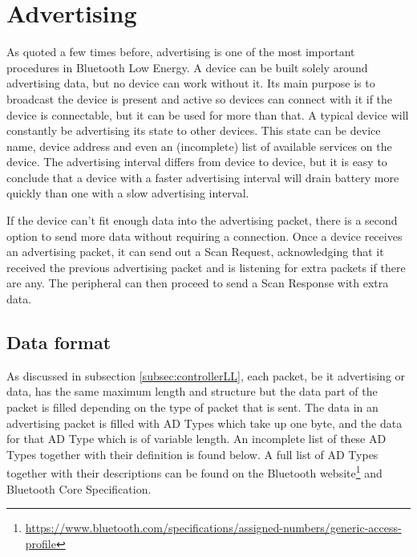 \documentclass[pdftex,a4paper,12pt,twoside]{report}
\begin{document}
\section{Advertising}
\label{sec:advertising}
As quoted a few times before, advertising is one of the most important procedures in Bluetooth Low Energy. A device can be built solely around advertising data, but no device can work without it. Its main purpose is to broadcast the device is present and active so devices can connect with it if the device is connectable, but it can be used for more than that. A typical device will constantly be advertising its state to other devices. This state can be device name, device address and even an (incomplete) list of available services on the device. The advertising interval differs from device to device, but it is easy to conclude that a device with a faster advertising interval will drain battery more quickly than one with a slow advertising interval.

If the device can't fit enough data into the advertising packet, there is a second option to send more data without requiring a connection. Once a device receives an advertising packet, it can send out a Scan Request, acknowledging that it received the previous advertising packet and is listening for extra packets if there are any. The peripheral can then proceed to send a Scan Response with extra data.

\subsection{Data format}
\label{subsec:advdataformat}
As discussed in subsection \ref{subsec:controllerLL}, each packet, be it advertising or data, has the same maximum length and structure but the data part of the packet is filled depending on the type of packet that is sent. The data in an advertising packet is filled with AD Types which take up one byte, and the data for that AD Type which is of variable length. An incomplete list of these AD Types together with their definition is found below. A full list of AD Types together with their descriptions can be found on the Bluetooth website\footnote{\url{https://www.bluetooth.com/specifications/assigned-numbers/generic-access-profile}} and Bluetooth Core Specification.
\end{document}
